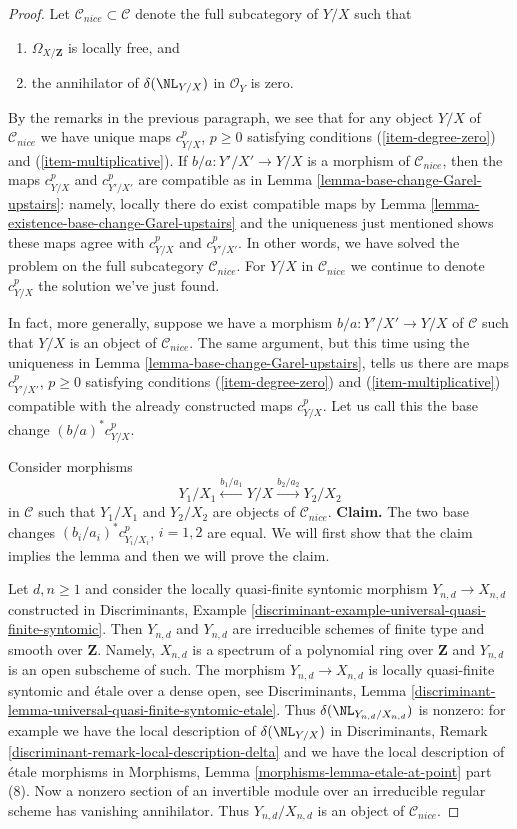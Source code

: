 \begin{proof}
\medskip\noindent
Let $\mathcal{C}_{nice} \subset \mathcal{C}$ denote the full subcategory
of $Y/X$ such that
\begin{enumerate}
\item $\Omega_{X/\mathbf{Z}}$ is locally free, and
\item the annihilator of $\delta(\NL_{Y/X})$ in $\mathcal{O}_Y$ is zero.
\end{enumerate}
By the remarks in the previous paragraph, we see that for any
object $Y/X$ of $\mathcal{C}_{nice}$ we have unique maps
$c^p_{Y/X}$, $p \geq 0$ satisfying conditions (\ref{item-degree-zero})
and (\ref{item-multiplicative}). If $b/a : Y'/X' \to Y/X$
is a morphism of $\mathcal{C}_{nice}$, then the maps
$c^p_{Y/X}$ and $c^p_{Y'/X'}$ are compatible as in
Lemma \ref{lemma-base-change-Garel-upstairs}: namely,
locally there do exist compatible maps by
Lemma \ref{lemma-existence-base-change-Garel-upstairs}
and the uniqueness just mentioned shows these maps agree
with $c^p_{Y/X}$ and $c^p_{Y'/X'}$.
In other words, we have solved the problem
on the full subcategory $\mathcal{C}_{nice}$. For $Y/X$ in $\mathcal{C}_{nice}$
we continue to denote $c^p_{Y/X}$ the solution we've just found.

\medskip\noindent
In fact, more generally, suppose we have a morphism $b/a : Y'/X' \to Y/X$
of $\mathcal{C}$ such that $Y/X$ is an object of $\mathcal{C}_{nice}$.
The same argument, but this time using the uniqueness in
Lemma \ref{lemma-base-change-Garel-upstairs}, tells us there are
maps $c^p_{Y'/X'}$, $p \geq 0$  satisfying conditions (\ref{item-degree-zero})
and (\ref{item-multiplicative}) compatible with the already constructed
maps $c^p_{Y/X}$. Let us call this the base change
$(b/a)^*c^p_{Y/X}$.

\medskip\noindent
Consider morphisms
$$
Y_1/X_1 \xleftarrow{b_1/a_1} Y/X \xrightarrow{b_2/a_2} Y_2/X_2
$$
in $\mathcal{C}$ such that $Y_1/X_1$ and $Y_2/X_2$ are objects
of $\mathcal{C}_{nice}$.
{\bf Claim.} The two base changes $(b_i/a_i)^*c^p_{Y_i/X_i}$, $i = 1, 2$
are equal. We will first show that the claim implies the lemma
and then we will prove the claim.

\medskip\noindent
Let $d, n \geq 1$ and consider the locally
quasi-finite syntomic morphism $Y_{n, d} \to X_{n, d}$
constructed in Discriminants, Example
\ref{discriminant-example-universal-quasi-finite-syntomic}.
Then $Y_{n, d}$ and $Y_{n, d}$ are irreducible schemes of finite type and
smooth over $\mathbf{Z}$. Namely, $X_{n, d}$ is a spectrum of a
polynomial ring over $\mathbf{Z}$ and $Y_{n, d}$ is an open subscheme
of such. The morphism $Y_{n, d} \to X_{n, d}$ is locally quasi-finite syntomic
and \'etale over a dense open, see Discriminants, Lemma
\ref{discriminant-lemma-universal-quasi-finite-syntomic-etale}.
Thus $\delta(\NL_{Y_{n, d}/X_{n, d}})$ is nonzero: for example we have
the local description of $\delta(\NL_{Y/X})$ in
Discriminants, Remark \ref{discriminant-remark-local-description-delta}
and we have the local description of \'etale morphisms in
Morphisms, Lemma \ref{morphisms-lemma-etale-at-point} part (8).
Now a nonzero section of an invertible module over an irreducible
regular scheme has vanishing annihilator. Thus
$Y_{n, d}/X_{n, d}$ is an object of $\mathcal{C}_{nice}$.


\end{proof}
